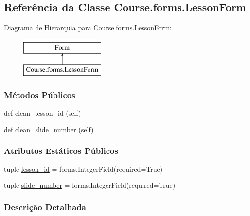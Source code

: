 \hypertarget{classCourse_1_1forms_1_1LessonForm}{}\subsection{Referência da Classe Course.\+forms.\+Lesson\+Form}
\label{classCourse_1_1forms_1_1LessonForm}
Diagrama de Hierarquia para Course.\+forms.\+Lesson\+Form\+:\begin{figure}[H]
\begin{center}
\leavevmode
\includegraphics[height=2.000000cm]{db/d84/classCourse_1_1forms_1_1LessonForm}
\end{center}
\end{figure}
\subsubsection*{Métodos Públicos}
\begin{DoxyCompactItemize}
\item 
def \hyperlink{classCourse_1_1forms_1_1LessonForm_a5e1afca616ce7fc80701a3df092325af}{clean\+\_\+lesson\+\_\+id} (self)
\item 
def \hyperlink{classCourse_1_1forms_1_1LessonForm_ae1d45c4578bfd73ae6b0f0b3f52ce8da}{clean\+\_\+slide\+\_\+number} (self)
\end{DoxyCompactItemize}
\subsubsection*{Atributos Estáticos Públicos}
\begin{DoxyCompactItemize}
\item 
tuple \hyperlink{classCourse_1_1forms_1_1LessonForm_a0ed8ca8dc81ac7498c83df4a5735ce04}{lesson\+\_\+id} = forms.\+Integer\+Field(required=True)
\item 
tuple \hyperlink{classCourse_1_1forms_1_1LessonForm_ad030e96bd25bff769cce537955b318d1}{slide\+\_\+number} = forms.\+Integer\+Field(required=True)
\end{DoxyCompactItemize}


\subsubsection{Descrição Detalhada}


